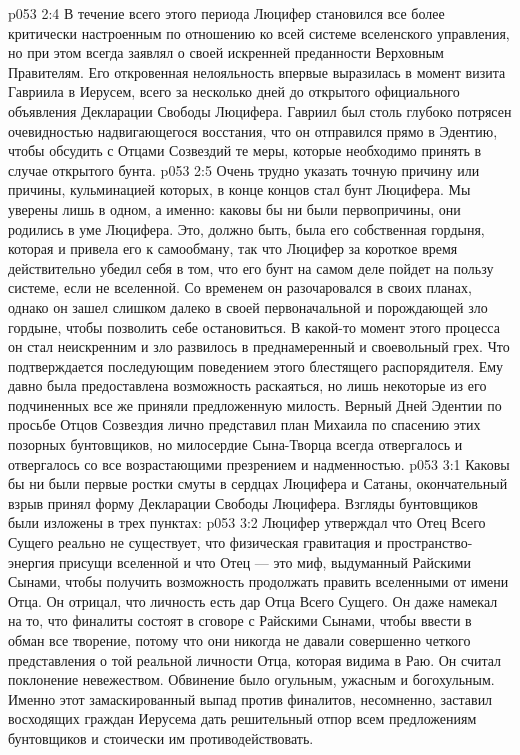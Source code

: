 \vs p053 2:4 В течение всего этого периода Люцифер становился все более критически настроенным по отношению ко всей системе вселенского управления, но при этом всегда заявлял о своей искренней преданности Верховным Правителям. Его откровенная нелояльность впервые выразилась в момент визита Гавриила в Иерусем, всего за несколько дней до открытого официального объявления Декларации Свободы Люцифера. Гавриил был столь глубоко потрясен очевидностью надвигающегося восстания, что он отправился прямо в Эдентию, чтобы обсудить с Отцами Созвездий те меры, которые необходимо принять в случае открытого бунта.
\vs p053 2:5 Очень трудно указать точную причину или причины, кульминацией которых, в конце концов стал бунт Люцифера. Мы уверены лишь в одном, а именно: каковы бы ни были первопричины, они родились в уме Люцифера. Это, должно быть, была его собственная гордыня, которая и привела его к самообману, так что Люцифер за короткое время действительно убедил себя в том, что его бунт на самом деле пойдет на пользу системе, если не вселенной. Со временем он разочаровался в своих планах, однако он зашел слишком далеко в своей первоначальной и порождающей зло гордыне, чтобы позволить себе остановиться. В какой\hyp{}то момент этого процесса он стал неискренним и зло развилось в преднамеренный и своевольный грех. Что подтверждается последующим поведением этого блестящего распорядителя. Ему давно была предоставлена возможность раскаяться, но лишь некоторые из его подчиненных все же приняли предложенную милость. Верный Дней Эдентии по просьбе Отцов Созвездия лично представил план Михаила по спасению этих позорных бунтовщиков, но милосердие Сына\hyp{}Творца всегда отвергалось и отвергалось со все возрастающими презрением и надменностью.
\vs p053 3:1 Каковы бы ни были первые ростки смуты в сердцах Люцифера и Сатаны, окончательный взрыв принял форму Декларации Свободы Люцифера. Взгляды бунтовщиков были изложены в трех пунктах:
\vs p053 3:2 \pc {}\bibnobreakspace {} Люцифер утверждал что Отец Всего Сущего реально не существует, что физическая гравитация и пространство\hyp{}энергия присущи вселенной и что Отец --- это миф, выдуманный Райскими Сынами, чтобы получить возможность продолжать править вселенными от имени Отца. Он отрицал, что личность есть дар Отца Всего Сущего. Он даже намекал на то, что финалиты состоят в сговоре с Райскими Сынами, чтобы ввести в обман все творение, потому что они никогда не давали совершенно четкого представления о той реальной личности Отца, которая видима в Раю. Он считал поклонение невежеством. Обвинение было огульным, ужасным и богохульным. Именно этот замаскированный выпад против финалитов, несомненно, заставил восходящих граждан Иерусема дать решительный отпор всем предложениям бунтовщиков и стоически им противодействовать.
